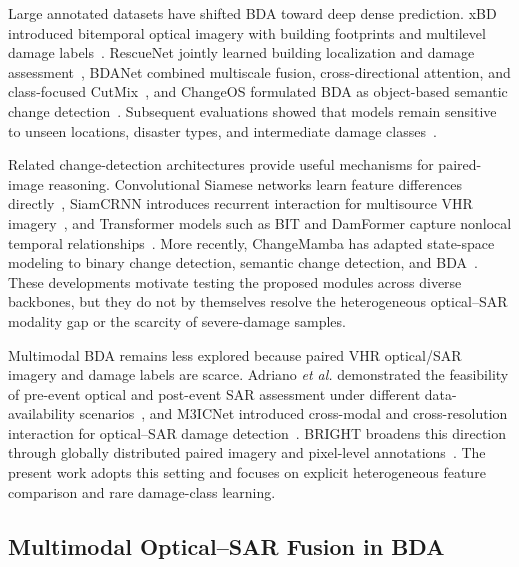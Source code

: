 \documentclass[journal]{IEEEtran}
\begin{document}
    Large annotated datasets have shifted BDA toward deep dense prediction. xBD introduced bitemporal optical imagery with building footprints and multilevel damage labels~\cite{gupta2019xbd}. RescueNet jointly learned building localization and damage assessment~\cite{gupta2021rescuenet}, BDANet combined multiscale fusion, cross-directional attention, and class-focused CutMix~\cite{shen2022bdanet}, and ChangeOS formulated BDA as object-based semantic change detection~\cite{zheng2021changeos}. Subsequent evaluations showed that models remain sensitive to unseen locations, disaster types, and intermediate damage classes~\cite{wiguna2024evaluation,hafner2025disasteradaptive}.
    
    Related change-detection architectures provide useful mechanisms for paired-image reasoning. Convolutional Siamese networks learn feature differences directly~\cite{daudt2018fcsiam}, SiamCRNN introduces recurrent interaction for multisource VHR imagery~\cite{chen2020siamcrnn}, and Transformer models such as BIT and DamFormer capture nonlocal temporal relationships~\cite{chen2022bit,chen2022damformer}. More recently, ChangeMamba has adapted state-space modeling to binary change detection, semantic change detection, and BDA~\cite{chen2024changemamba}. These developments motivate testing the proposed modules across diverse backbones, but they do not by themselves resolve the heterogeneous optical--SAR modality gap or the scarcity of severe-damage samples.
    
    Multimodal BDA remains less explored because paired VHR optical/SAR imagery and damage labels are scarce. Adriano \emph{et al.} demonstrated the feasibility of pre-event optical and post-event SAR assessment under different data-availability scenarios~\cite{adriano2021multimodal}, and M3ICNet introduced cross-modal and cross-resolution interaction for optical--SAR damage detection~\cite{zhang2025m3icnet}. BRIGHT broadens this direction through globally distributed paired imagery and pixel-level annotations~\cite{chen2025bright}. The present work adopts this setting and focuses on explicit heterogeneous feature comparison and rare damage-class learning.
    
    \subsection{Multimodal Optical--SAR Fusion in BDA}
    
\end{document}
